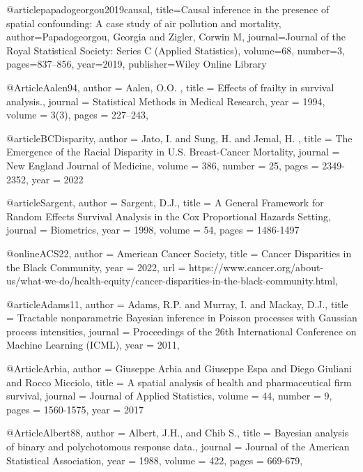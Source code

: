 @article{papadogeorgou2019causal,
  title={Causal inference in the presence of spatial confounding: A case study of air pollution and mortality},
  author={Papadogeorgou, Georgia and Zigler, Corwin M},
  journal={Journal of the Royal Statistical Society: Series C (Applied Statistics)},
  volume={68},
  number={3},
  pages={837--856},
  year={2019},
  publisher={Wiley Online Library}
}



@Article{Aalen94,
   author =   {Aalen, O.O. },
   title =    {Effects of frailty in survival analysis.},
   journal =      {Statistical Methods in Medical Research},
   year =     {1994},
   volume =   {3(3)},
   pages =    {227–243},
 }

@article{BCDisparity,
author = {Jato, I.  and Sung, H.  and Jemal, H. },
title = {The Emergence of the Racial Disparity in U.S. Breast-Cancer Mortality},
journal = {New England Journal of Medicine},
volume = {386},
number = {25},
pages = {2349-2352},
year = {2022}}

@article{Sargent,
    author = {Sargent, D.J.},
    title = {A General Framework for Random Effects Survival Analysis in the Cox Proportional Hazards Setting},
    journal = {Biometrics},
    year = {1998},
volume = {54},
pages = {1486-1497}
}




@online{ACS22,
  author = {American Cancer Society},
  title = {Cancer Disparities in the Black Community},
  year = 2022,
  url = {https://www.cancer.org/about-us/what-we-do/health-equity/cancer-disparities-in-the-black-community.html},
  }


 
 @article{Adams11,
   author =   {Adams, R.P. and Murray, I. and Mackay, D.J.},
   title =    {Tractable nonparametric Bayesian inference in Poisson processes with Gaussian process intensities},
   journal =    {Proceedings of the 26th International Conference on Machine Learning (ICML)},
   year =     {2011}, }


@Article{Arbia,
author = {Giuseppe Arbia and Giuseppe Espa and Diego Giuliani and Rocco Micciolo},
title = {A spatial analysis of health and pharmaceutical firm survival},
journal = {Journal of Applied Statistics},
volume = {44},
number = {9},
pages = {1560-1575},
year  = {2017}}



@Article{Albert88,
   author =   {Albert, J.H., and Chib S.},
   title =    {Bayesian analysis of binary and polychotomous response data.},
   journal =      {Journal of the American Statistical Association},
   year =     {1988},
   volume =   {422},
   pages =    {669-679},
 }



